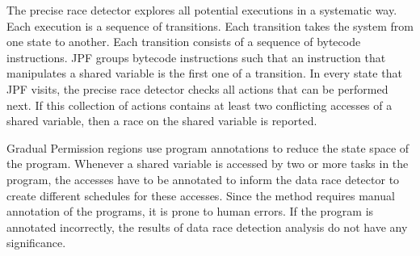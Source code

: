 The precise race detector explores all potential executions in a systematic way. Each execution is a sequence of transitions. Each transition takes the system from one state to another. Each transition consists of a sequence of bytecode instructions. JPF groups bytecode instructions such that an instruction that manipulates a shared variable is the first one of a transition. In every state that JPF visits, the precise race detector checks all actions that can be performed next. If this collection of actions contains at least two conflicting accesses of a shared variable, then a race on the shared variable is reported.

Gradual Permission regions use program annotations to reduce the state space of the program. Whenever a shared variable is accessed by two or more tasks in the program, the accesses have to be annotated to inform the data race detector to create different schedules for these accesses. Since the method requires manual annotation of the programs, it is prone to human errors. If the program is annotated incorrectly, the results of data race detection analysis do not have any significance.

